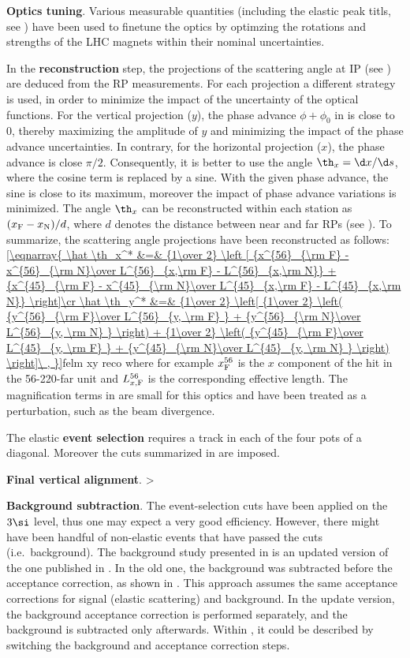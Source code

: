 \> {\bf Optics tuning}. Various measurable quantities (including the elastic peak titls, see ) have been used to finetune the optics by optimzing the rotations and strengths of the LHC magnets within their nominal uncertainties.

\> In the {\bf reconstruction} step, the projections of the scattering angle at IP (see ) are deduced from the RP measurements. For each projection a different strategy is used, in order to minimize the impact of the uncertainty of the optical functions. For the vertical projection ($y$), the phase advance $\phi+\phi_0$ in  is close to $0$, thereby maximizing the amplitude of $y$ and minimizing the impact of the phase advance uncertainties. In contrary, for the horizontal projection ($x$), the phase advance is close $\pi/2$. Consequently, it is better to use the angle $\th_x = \d x/\d s$, where the cosine term is replaced by a sine. With the given phase advance, the sine is close to its maximum, moreover the impact of phase advance variations is minimized. The angle $\th_x$ can be reconstructed within each station as $(x_{\rm F} - x_{\rm N}) / d$, where $d$ denotes the distance between near and far RPs (see ). To summarize, the scattering angle projections have been reconstructed as follows:
\eqref{\eqnarray{
\hat \th_x^* &=& {1\over 2} \left [
		{x^{56}_{\rm F} - x^{56}_{\rm N}\over L^{56}_{x,\rm F} - L^{56}_{x,\rm N}}
		+ {x^{45}_{\rm F} - x^{45}_{\rm N}\over L^{45}_{x,\rm F} - L^{45}_{x,\rm N}}
	\right]\cr
\hat \th_y^* &=& {1\over 2} \left[
		{1\over 2} \left( {y^{56}_{\rm F}\over L^{56}_{y, \rm F} } + {y^{56}_{\rm N}\over L^{56}_{y, \rm N} } \right)
		+ {1\over 2} \left( {y^{45}_{\rm F}\over L^{45}_{y, \rm F} } + {y^{45}_{\rm N}\over L^{45}_{y, \rm N} } \right)
	\right]\ ,
}}{felm xy reco}
where for example $x^{56}_{\rm F}$ is the $x$ component of the hit in the 56-220-far unit and $L^{56}_{x, \rm F}$ is the corresponding effective length. The magnification terms in  are small for this optics and have been treated as a perturbation, such as the beam divergence.

\> The elastic {\bf event selection} requires a track in each of the four pots of a diagonal. Moreover the cuts summarized in  are imposed.

\> {\bf Final vertical alignment}.
\>> 

\> {\bf Background subtraction}. The event-selection cuts have been applied on the $3\si$ level, thus one may expect a very good efficiency. However, there might have been handful of non-elastic events that have passed the cuts (i.e.~background). The background study presented in  is an updated version of the one published in . In the old one, the background was subtracted before the acceptance correction, as shown in . This approach assumes the same acceptance corrections for signal (elastic scattering) and background. In the update version, the background acceptance correction is performed separately, and the background is subtracted only afterwards. Within , it could be described by switching the background and acceptance correction steps.

